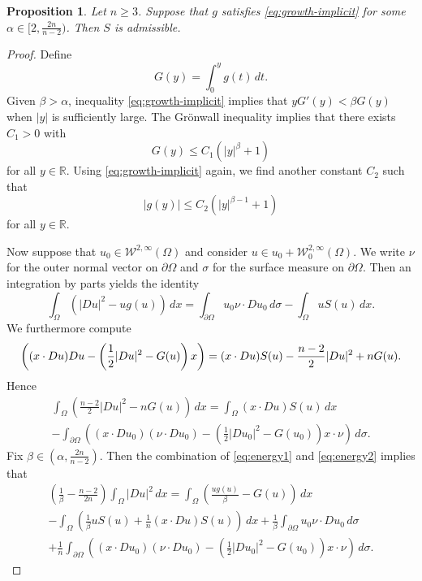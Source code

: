\documentclass[a4paper]{article}
\newcommand{\R}{\mathbb{R}}
\newcommand{\W}{\mathcal{W}}
\let\div\relax\DeclareMathOperator{\div}{div}
\newtheorem{proposition}[theorem]{Proposition}
\theoremstyle{remark}
\begin{document}
\begin{proposition}
Let $n \ge 3$. Suppose that $g$ satisfies \eqref{eq:growth-implicit}
for some $\alpha \in [2, \frac{2n}{n - 2})$. Then $S$ is admissible.
\end{proposition}

\begin{proof}
Define
\[
G(y) = \int_0^y g(t) \, dt.
\]
Given $\beta > \alpha$, inequality \eqref{eq:growth-implicit} implies that
$y G'(y) < \beta G(y)$ when $|y|$ is sufficiently large. The Gr\"onwall
inequality implies that there exists
$C_1 > 0$ with
\[
G(y) \le C_1 (|y|^\beta + 1)
\]
for all $y \in \R$. Using \eqref{eq:growth-implicit} again, we find another
constant $C_2$ such that
\begin{equation} \label{eq:growth-explicit}
|g(y)| \le C_2(|y|^{\beta - 1} + 1)
\end{equation}
for all $y \in \R$.

Now suppose that $u_0 \in \W^{2, \infty}(\Omega)$ and consider
$u \in u_0 + \W_0^{2, \infty}(\Omega)$. We write $\nu$ for the outer normal
vector on $\partial \Omega$ and $\sigma$ for the surface measure on
$\partial \Omega$. Then an integration by parts yields the
identity
\begin{equation} \label{eq:energy1}
\int_\Omega (|Du|^2 - ug(u)) \, dx = \int_{\partial \Omega} u_0 \nu \cdot Du_0 \, d\sigma - \int_\Omega u S(u) \, dx.
\end{equation}
We furthermore compute
\[
\div \left((x \cdot Du) Du - \left(\frac{1}{2} |Du|^2 - G(u)\right) x\right) = (x \cdot Du) S(u) - \frac{n - 2}{2} |Du|^2 + n G(u).
\]
Hence
\begin{multline} \label{eq:energy2}
\int_\Omega \left(\frac{n - 2}{2} |Du|^2 - n G(u)\right) \, dx = \int_\Omega (x \cdot Du) S(u) \, dx \\
- \int_{\partial \Omega} \left((x \cdot Du_0) (\nu \cdot Du_0) - \left(\frac{1}{2} |Du_0|^2 - G(u_0)\right) x \cdot \nu \right) \, d\sigma.
\end{multline}
Fix $\beta \in (\alpha, \frac{2n}{n - 2})$. Then the combination of
\eqref{eq:energy1} and \eqref{eq:energy2} implies that
\begin{multline} \label{eq:example2}
\left(\frac{1}{\beta} - \frac{n - 2}{2n}\right) \int_\Omega |Du|^2 \, dx = \int_\Omega \left(\frac{u g(u)}{\beta} - G(u)\right) \, dx \\
- \int_\Omega \left(\frac{1}{\beta} uS(u) + \frac{1}{n} (x \cdot Du) S(u)\right) \, dx + \frac{1}{\beta} \int_{\partial \Omega} u_0 \nu \cdot Du_0 \, d\sigma \\
+ \frac{1}{n} \int_{\partial \Omega} \left((x \cdot Du_0) (\nu \cdot Du_0) - \left(\frac{1}{2} |Du_0|^2 - G(u_0)\right) x \cdot \nu \right) \, d\sigma.
\end{multline}


\end{proof}
\end{document}
